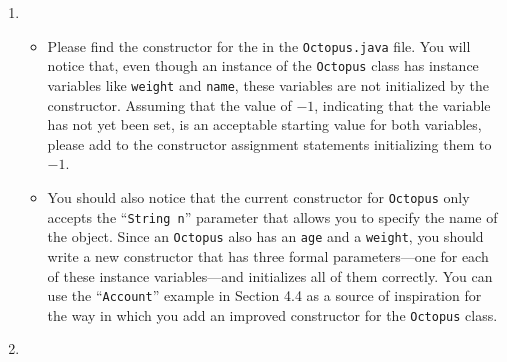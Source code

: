 \begin{enumerate}
\item 

\begin{itemize}


  \item Please find the constructor for the in the {\tt Octopus.java} file.  You will notice that, even though an
    instance of the {\tt Octopus} class has instance variables like {\tt weight} and {\tt name}, these variables are not
    initialized by the constructor. Assuming that the value of $-1$, indicating that the variable has not yet been set,
    is an acceptable starting value for both variables, please add to the constructor assignment statements initializing
    them to $-1$.
    

  \item You should also notice that the current constructor for {\tt Octopus} only accepts the ``{\tt String n}''
    parameter that allows you to specify the name of the object.  Since an {\tt Octopus} also has an {\tt age} and a
    {\tt weight}, you should write a new constructor that has three formal parameters---one for each of these instance
    variables---and initializes all of them correctly. You can use the ``{\tt Account}'' example in Section 4.4 as a
    source of inspiration for the way in which you add an improved constructor for the {\tt Octopus} class.

\end{itemize} 


\item 
\begin{itemize}


\end{itemize}
\end{enumerate}
